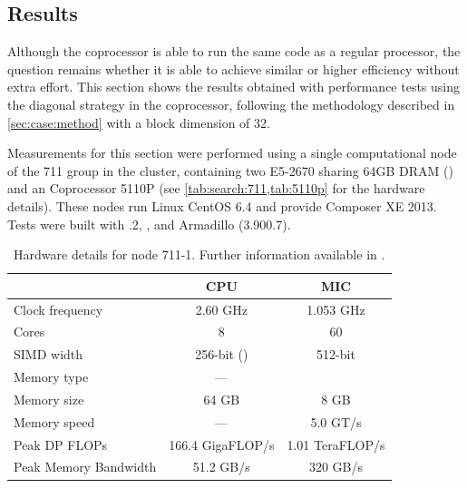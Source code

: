 \documentclass[../thesis]{subfiles}
\begin{document}
	\subsection{Results}
	\label{subsec:mic:native:results}

	Although the \intel\xeonphi coprocessor is able to run the same code as a regular \intel\xeon processor, the question remains whether it is able to achieve similar or higher efficiency without extra effort. This section shows the results obtained with performance tests using the diagonal strategy in the coprocessor, following the methodology described in \cref{sec:case:method} with a block dimension of 32.

	Measurements for this section were performed using a single computational node of the 711 group in the \search cluster, containing two \intel\xeon E5-2670 \cpus sharing 64GB DRAM (\numa) and an \intel\xeonphi Coprocessor 5110P (see \cref{tab:search:711,tab:5110p} for the hardware details). These nodes run Linux CentOS 6.4 and provide \intel Composer XE 2013. Tests were built with .2, \mkl, and Armadillo (3.900.7).

	\begin{table}[p]
		\centering
		\begin{tabular}{|l|c|c|}
			\hline
			& \textbf{CPU} & \textbf{MIC}  \\
			\hline
			Clock frequency & 2.60 GHz & 1.053 GHz  \\
			Cores & 8 & 60  \\
			SIMD width & 256-bit (\avx) & 512-bit  \\
			Memory type & --- & \gddr5  \\
			Memory size & 64 GB & 8 GB  \\
			Memory speed & --- & 5.0 GT/s  \\
			\hline
			Peak DP FLOPs & 166.4 GigaFLOP/s & 1.01 TeraFLOP/s  \\
			Peak Memory Bandwidth & 51.2 GB/s & 320 GB/s  \\ 
			\hline
		\end{tabular}
		\caption{Hardware details for \search node 711-1. Further information available in \cite{Intel:Xeon:e5_2670,Intel:Xeon:e5_2600,Intel:XeonPhi:5110P}.}
		\label{tab:search:711}
	\end{table}
\end{document}

